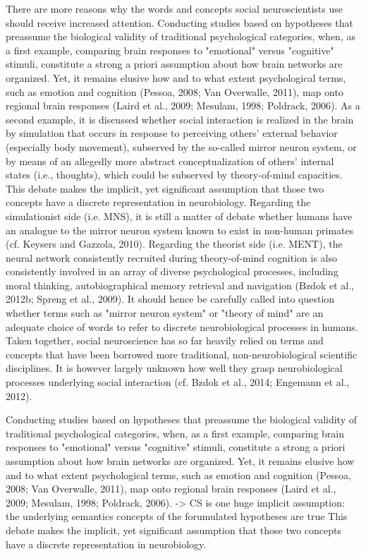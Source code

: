 \documentclass[authoryear,review,3p]{elsarticle}
\begin{document}
There are more reasons why the words and concepts social neuroscientists use should receive increased attention. Conducting studies based on hypotheses that preassume the biological validity of traditional psychological categories, when, as a first example, comparing brain responses to "emotional" versus "cognitive" stimuli, constitute a strong a priori assumption about how brain networks are organized. Yet, it remains elusive how and to what extent psychological terms, such as emotion and cognition (Pessoa, 2008; Van Overwalle, 2011), map onto regional brain responses (Laird et al., 2009; Mesulam, 1998; Poldrack, 2006). As a second example, it is discussed whether social interaction is realized in the brain by simulation that occurs in response to perceiving others' external behavior (especially body movement), subserved by the so-called mirror neuron system, or by means of an allegedly more abstract conceptualization of others' internal states (i.e., thoughts), which could be subserved by theory-of-mind capacities. This debate makes the implicit, yet significant assumption that those two concepts have a discrete representation in neurobiology. Regarding the simulationist side (i.e. MNS), it is still a matter of debate whether humans have an analogue to the mirror neuron system known to exist in non-human primates (cf. Keysers and Gazzola, 2010). Regarding the theorist side (i.e. MENT), the neural network consistently recruited during theory-of-mind cognition is also consistently involved in an array of diverse psychological processes, including moral thinking, autobiographical memory retrieval and navigation (Bzdok et al., 2012b; Spreng et al., 2009). It should hence be carefully called into question whether terms such as "mirror neuron system" or "theory of mind" are an adequate choice of words to refer to discrete neurobiological processes in humans. Taken together, social neuroscience has so far heavily relied on terms and concepts that have been borrowed more traditional, non-neurobiological scientific disciplines. It is however largely unknown how well they grasp neurobiological processes underlying social interaction (cf. Bzdok et al., 2014; Engemann et al., 2012).

Conducting studies based on hypotheses that preassume the biological validity of traditional psychological categories, when, as a first example, comparing brain responses to "emotional" versus "cognitive" stimuli, constitute a strong a priori assumption about how brain networks are organized. Yet, it remains elusive how and to what extent psychological terms, such as emotion and cognition (Pessoa, 2008; Van Overwalle, 2011), map onto regional brain responses (Laird et al., 2009; Mesulam, 1998; Poldrack, 2006). 
-> CS is one huge implicit assumption:
the underlying semantics concepts of the forumulated hypotheses are true
This debate makes the implicit, yet significant assumption that those two concepts have a discrete representation in neurobiology. 
\end{document}
